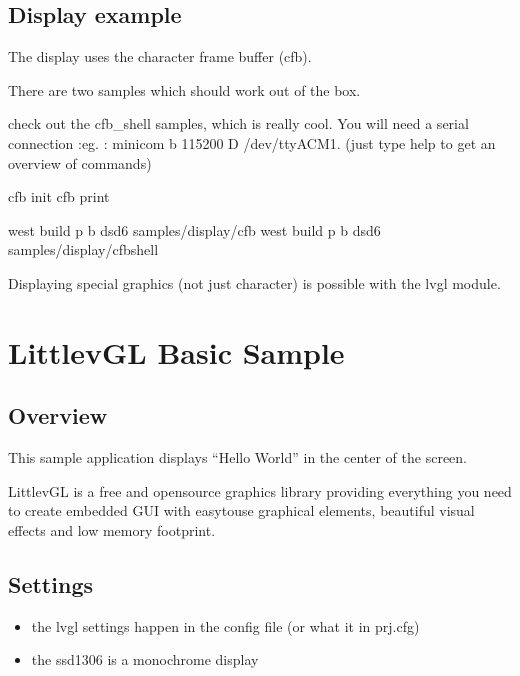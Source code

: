 \documentclass[letterpaper,10pt,english]{sphinxmanual}
\begin{document}
\section{Display    example}
\label{\detokenize{display:display-example}}
The display uses the character frame buffer (cfb).

There are two samples which should work out of the box.

check out the  cfb\_shell \sphinxhyphen{} samples, which is really cool.
You will need a serial connection :eg. :  minicom \sphinxhyphen{}b 115200 \sphinxhyphen{}D /dev/ttyACM1.
(just type help to get an overview of commands)

\begin{sphinxVerbatim}[commandchars=\\\{\}]
  cfb init
  cfb print   
\end{sphinxVerbatim}

\begin{sphinxVerbatim}[commandchars=\\\{\}]
  west build \PYGZhy{}p \PYGZhy{}b ds\PYGZus{}d6 samples/display/cfb
  west build \PYGZhy{}p \PYGZhy{}b ds\PYGZus{}d6 samples/display/cfb\PYGZus{}shell
\end{sphinxVerbatim}

Displaying special graphics (not just character) is  possible with the lvgl module.


\chapter{LittlevGL Basic Sample}
\label{\detokenize{lvgl:littlevgl-basic-sample}}\label{\detokenize{lvgl:lvgl-sample}}\label{\detokenize{lvgl::doc}}

\section{Overview}
\label{\detokenize{lvgl:overview}}
This sample application displays “Hello World” in the center of the screen.

LittlevGL is a free and open\sphinxhyphen{}source graphics library providing everything you need to create embedded GUI with easy\sphinxhyphen{}to\sphinxhyphen{}use graphical elements, beautiful visual effects and low memory footprint.


\section{Settings}
\label{\detokenize{lvgl:settings}}\begin{itemize}
\item {} 
the lvgl settings happen in the config file (or what it in prj.cfg)

\item {} 
the ssd1306 is a monochrome display

\end{itemize}
\end{document}
